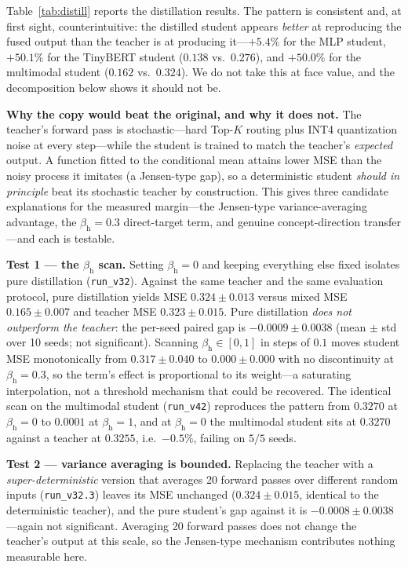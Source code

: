 \documentclass[10pt,twoside]{article}
\theoremstyle{definition}
\theoremstyle{plain}
\theoremstyle{remark}
\begin{document}
Table~\ref{tab:distill} reports the distillation results. The pattern is consistent and, at first sight, counterintuitive: the distilled student appears \emph{better} at reproducing the fused output than the teacher is at producing it---$+5.4\%$ for the MLP student, $+50.1\%$ for the TinyBERT student ($0.138$ vs.\ $0.276$), and $+50.0\%$ for the multimodal student ($0.162$ vs.\ $0.324$). We do not take this at face value, and the decomposition below shows it should not be.

\textbf{Why the copy would beat the original, and why it does not.} The teacher's forward pass is stochastic---hard Top-$K$ routing plus INT4 quantization noise at every step---while the student is trained to match the teacher's \emph{expected} output. A function fitted to the conditional mean attains lower MSE than the noisy process it imitates (a Jensen-type gap), so a deterministic student \emph{should in principle} beat its stochastic teacher by construction. This gives three candidate explanations for the measured margin---the Jensen-type variance-averaging advantage, the $\beta_{\text{h}}=0.3$ direct-target term, and genuine concept-direction transfer---and each is testable.

\textbf{Test 1 --- the $\beta_{\text{h}}$ scan.} Setting $\beta_{\text{h}}=0$ and keeping everything else fixed isolates pure distillation (\texttt{run\_v32}). Against the same teacher and the same evaluation protocol, pure distillation yields MSE $0.324 \pm 0.013$ versus mixed MSE $0.165 \pm 0.007$ and teacher MSE $0.323 \pm 0.015$. Pure distillation \emph{does not outperform the teacher}: the per-seed paired gap is $-0.0009 \pm 0.0038$ (mean $\pm$ std over 10 seeds; not significant). Scanning $\beta_{\text{h}} \in [0,1]$ in steps of $0.1$ moves student MSE monotonically from $0.317 \pm 0.040$ to $0.000 \pm 0.000$ with no discontinuity at $\beta_{\text{h}}=0.3$, so the term's effect is proportional to its weight---a saturating interpolation, not a threshold mechanism that could be recovered. The identical scan on the multimodal student (\texttt{run\_v42}) reproduces the pattern from $0.3270$ at $\beta_{\text{h}}{=}0$ to $0.0001$ at $\beta_{\text{h}}{=}1$, and at $\beta_{\text{h}}{=}0$ the multimodal student sits at $0.3270$ against a teacher at $0.3255$, i.e.\ $-0.5\%$, failing on $5/5$ seeds.

\textbf{Test 2 --- variance averaging is bounded.} Replacing the teacher with a \emph{super-deterministic} version that averages 20 forward passes over different random inputs (\texttt{run\_v32.3}) leaves its MSE unchanged ($0.324 \pm 0.015$, identical to the deterministic teacher), and the pure student's gap against it is $-0.0008 \pm 0.0038$---again not significant. Averaging 20 forward passes does not change the teacher's output at this scale, so the Jensen-type mechanism contributes nothing measurable here.
\end{document}
